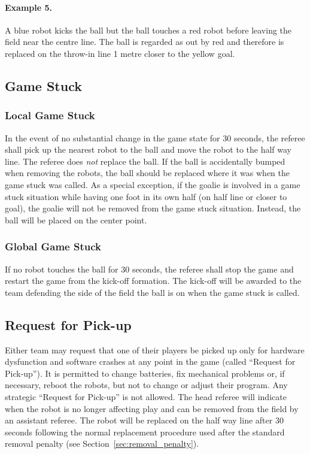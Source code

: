 \documentclass[12pt]{article}
\begin{document}
\paragraph{Example 5.} A blue robot kicks the ball but the ball
touches a red robot before leaving the field near the centre line.
The ball is regarded as out by red and therefore
is replaced on the throw-in line 1 metre closer to the yellow goal.

\subsection{Game Stuck}
\subsubsection{Local Game Stuck}

In the event of no substantial change in the game state for 30
seconds, the referee shall pick up the nearest robot to the ball and move the robot 
to the half way line.  The referee does \emph{not} replace the ball.  
If the ball is accidentally bumped when removing the robots, the ball should be replaced where
it was when the game stuck was called.  As a special exception, if
the goalie is involved in a game stuck situation while having one foot
in its own half (on half line or closer to goal), the goalie will
not be removed from the game stuck situation. Instead, the ball will be placed on the center point.


\subsubsection{Global Game Stuck}
If no robot touches the ball for 30 seconds, the referee shall stop
the game and restart the game from the kick-off formation. The
kick-off will be awarded to the team defending the side of the field
the ball is on when the game stuck is called.

\subsection{Request for Pick-up}
Either team may request that one of their players be picked up only
for hardware dysfunction and software crashes at any point in the
game (called ``Request for Pick-up''). It is permitted to change
batteries, fix mechanical problems or, if necessary, reboot the
robots, but not to change or adjust their program. Any strategic
``Request for Pick-up'' is not allowed.  The head referee will
indicate when the robot is no longer affecting play and can be
removed from the field by an assistant referee.  The robot will be
replaced on the half way line after 30 seconds following the normal
replacement procedure used after the standard removal penalty (see
Section~\ref{sec:removal_penalty}).
\end{document}
